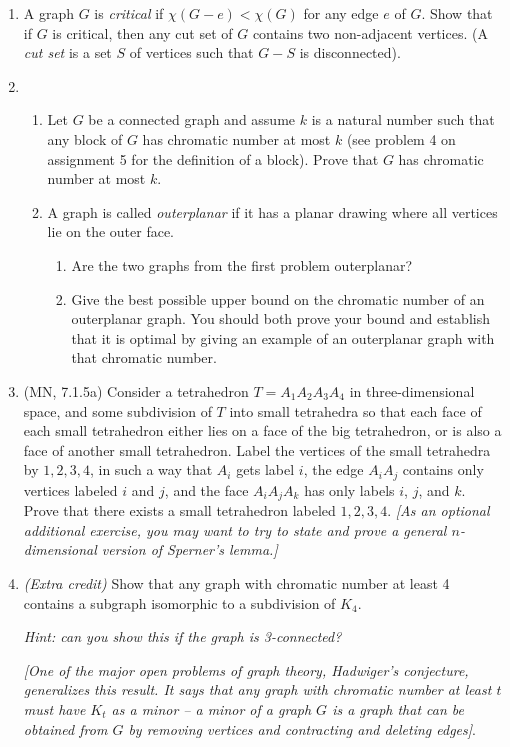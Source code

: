 \documentclass{amsart}
\theoremstyle{definition}
\begin{document}
\begin{enumerate}
\item A graph $G$ is \emph{critical} if $\chi (G - e) < \chi (G)$ for any edge $e$ of $G$. Show that if $G$ is critical, then any cut set of $G$ contains two non-adjacent vertices. (A \emph{cut set} is a set $S$ of vertices such that $G - S$ is disconnected).
\item
  \begin{enumerate}
  \item Let $G$ be a connected graph and assume $k$ is a natural number such that any block of $G$ has chromatic number at most $k$ (see problem 4 on assignment 5 for the definition of a block). Prove that $G$ has chromatic number at most $k$.
  \item A graph is called \emph{outerplanar} if it has a planar drawing where all vertices lie on the outer face.
  \begin{enumerate}
  \item Are the two graphs from the first problem outerplanar?
  \item Give the best possible upper bound on the chromatic number of an outerplanar graph. You should both prove your bound and establish that it is optimal by giving an example of an outerplanar graph with that chromatic number.
  \end{enumerate}
  \end{enumerate}
\item (MN, 7.1.5a)  Consider a  tetrahedron $T = A_1 A_2 A_3 A_4$ in three-dimensional space, and some subdivision of $T$ into small tetrahedra so that each face of each small tetrahedron either lies on a face of the big tetrahedron, or is also a face of another small tetrahedron. Label the vertices of the small tetrahedra by $1, 2, 3, 4$, in such a way that $A_i$ gets label $i$, the edge $A_i A_j$ contains only vertices labeled $i$ and $j$, and the face $A_i A_j A_k$ has only labels $i$, $j$, and $k$. Prove that there exists a small tetrahedron labeled $1, 2, 3, 4$.  \emph{[As an optional additional exercise, you may want to try to state and prove a general $n$-dimensional version of Sperner's lemma.]}


\item \emph{(Extra credit)} Show that any graph with chromatic number at least 4 contains a subgraph isomorphic to a subdivision of $K_4$.

  \emph{Hint: can you show this if the graph is 3-connected?}

  \emph{[One of the major open problems of graph theory, Hadwiger's conjecture, generalizes this result. It says that any graph with chromatic number at least $t$ must have $K_t$ as a minor -- a minor of a graph $G$ is a graph that can be obtained from $G$ by removing vertices and contracting and deleting edges]}.

\end{enumerate}
\end{document}
